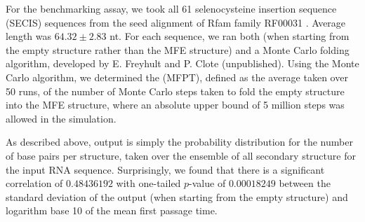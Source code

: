 For the benchmarking assay, we took all 61 selenocysteine insertion sequence
(SECIS) sequences from the seed alignment of Rfam family RF00031
\citep{Gardner.nar11}. Average length was $64.32 \pm 2.83$ nt.
For each sequence, we ran both \fftbor (when starting
from the empty structure rather than the MFE structure) and a Monte Carlo
folding algorithm, developed by E. Freyhult and P. Clote (unpublished).
Using the Monte Carlo algorithm, we
determined the \mfpt (MFPT), defined as the average
taken over 50 runs, of the number of Monte Carlo steps taken to fold
the empty structure into the MFE structure, where an absolute upper bound
of 5 million steps was allowed in the simulation.

As described above, \fftbor output is simply
the probability distribution
for the number of base pairs per structure, taken over the ensemble
of all secondary structure for the input RNA
sequence. Surprisingly, we found that there is a significant
correlation of  $0.48436192$ with one-tailed
$p$-value of $0.00018249$ between the
standard deviation of the \fftbor output (when starting from the
empty structure) and logarithm base 10 of the mean first passage time.


